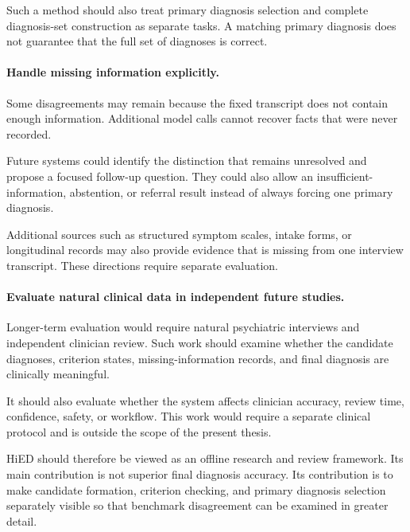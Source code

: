 \documentclass[12pt,a4paper,oneside]{report}
\begin{document}
Such a method should also treat primary diagnosis selection and complete
diagnosis-set construction as separate tasks. A matching primary
diagnosis does not guarantee that the full set of diagnoses is correct.

\paragraph{Handle missing information explicitly.}

Some disagreements may remain because the fixed transcript does not
contain enough information. Additional model calls cannot recover facts
that were never recorded.

Future systems could identify the distinction that remains unresolved
and propose a focused follow-up question. They could also allow an
insufficient-information, abstention, or referral result instead of
always forcing one primary diagnosis.

Additional sources such as structured symptom scales, intake forms, or
longitudinal records may also provide evidence that is missing from one
interview transcript. These directions require separate evaluation.

\paragraph{Evaluate natural clinical data in independent future
studies.}

Longer-term evaluation would require natural psychiatric interviews and
independent clinician review. Such work should examine whether the
candidate diagnoses, criterion states, missing-information records, and
final diagnosis are clinically meaningful.

It should also evaluate whether the system affects clinician accuracy,
review time, confidence, safety, or workflow. This work would require a
separate clinical protocol and is outside the scope of the present
thesis.

HiED should therefore be viewed as an offline research and review
framework. Its main contribution is not superior final diagnosis
accuracy. Its contribution is to make candidate formation, criterion
checking, and primary diagnosis selection separately visible so that
benchmark disagreement can be examined in greater detail.

\appendix
{}
\end{document}

